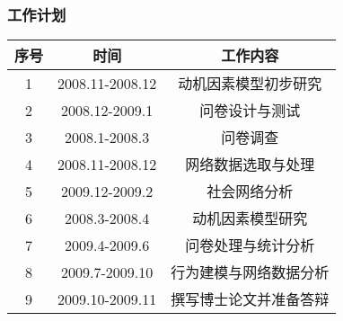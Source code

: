 \documentclass[slidestop,compress,mathserif,blue,compress]{beamer}
\begin{document}
\begin{frame}
  \frametitle{工作计划}
  \begin{center}
  \begin{tabular}[center]{|c|c|c|}
 \hline
序号&时间&工作内容\\
\hline
1&2008.11-2008.12&动机因素模型初步研究\\
\hline
2&2008.12-2009.1&问卷设计与测试\\
\hline
3&2008.1-2008.3&问卷调查\\
\hline
4&2008.11-2008.12&网络数据选取与处理\\
\hline
5&2009.12-2009.2&社会网络分析\\
\hline
6&2008.3-2008.4&动机因素模型研究\\
\hline
7&2009.4-2009.6&问卷处理与统计分析\\
\hline
8&2009.7-2009.10&行为建模与网络数据分析\\
\hline
9&2009.10-2009.11&撰写博士论文并准备答辩\\   
\hline
  \end{tabular}
\end{center}

\end{frame}
\end{document}
